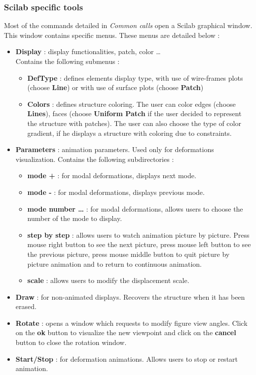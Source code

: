 \newpage
\subsubsection{Scilab specific tools \label{visusci}}
Most of the commands detailed in {\sl Common calls}  open a Scilab graphical window. This window contains specific menus. These menus are detailed below :
\begin{itemize}
\item {\bf Display} : display functionalities, patch, color \ldots \\Contains the following submenus :
\begin{itemize}
\item {\bf DefType} : defines elements display type, with use of wire-frames plots (choose {\bf Line}) or with use of surface plots (choose {\bf Patch})
\item {\bf Colors} : defines structure coloring. The user can color edges (choose {\bf Lines}), faces (choose {\bf Uniform Patch} if the user decided to represent the structure with patches). The user can also choose the type of color gradient, if he displays a structure with coloring due to constraints.
\end{itemize}
\item {\bf Parameters} : animation parameters. Used only for deformations visualization. Contains the following subdirectories :
\begin{itemize}
\item {\bf mode +} : for modal deformations, displays next mode.
\item {\bf mode -} : for modal deformations, displays previous mode.
\item {\bf mode number \ldots} : for modal deformations, allows users to choose the number of the mode to display.
\item {\bf step by step} : allows users to watch animation picture by picture. Press mouse right button to see the next picture, press mouse left button to see the previous picture, press mouse middle button to quit picture by picture animation and to return to continuous animation.
\item {\bf scale} : allows users to modify the displacement scale.
\end{itemize}
\item {\bf Draw} : for non-animated displays. Recovers the structure when it has been erased.
\item {\bf Rotate} : opens a window which requests to modify figure view angles. Click on the {\bf ok} button to visualize the new viewpoint and click on the {\bf cancel} button to close the rotation window.
\item {\bf Start/Stop} : for deformation animations. Allows users to stop or restart animation.
\end{itemize}
